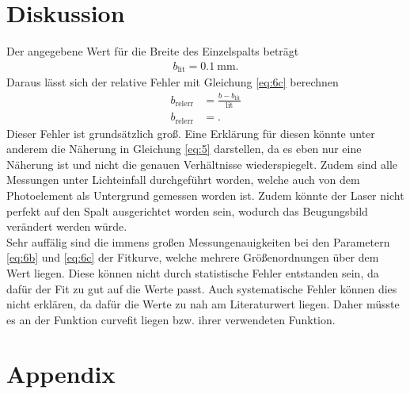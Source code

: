\section{Diskussion}
Der angegebene Wert für die Breite des Einzelspalts beträgt
\begin{align}
    b_{\text{lit}} = \SI{0.1}{\milli\meter}. \label{eq:10}
\end{align}
Daraus lässt sich der relative Fehler mit Gleichung \eqref{eq:6c} berechnen
\begin{align}
    b_{\text{relerr}} &= \frac{b-b_{\text{lit}}}{\text{lit}} \label{eq:11}\\
    b_{\text{relerr}} &= \text{}.
\end{align}
Dieser Fehler ist grundsätzlich groß. Eine Erklärung für diesen könnte unter anderem
die Näherung in Gleichung \eqref{eq:5} darstellen, da es eben nur eine Näherung
ist und nicht die genauen Verhältnisse wiederspiegelt. Zudem sind alle Messungen
unter Lichteinfall durchgeführt worden, welche auch von dem Photoelement als Untergrund
gemessen worden ist. Zudem könnte der Laser nicht perfekt auf den Spalt ausgerichtet worden
sein, wodurch das Beugungsbild verändert werden würde.\\ Sehr auffälig sind die immens 
großen Messungenauigkeiten bei den Parametern \eqref{eq:6b} und \eqref{eq:6c} der Fitkurve,
welche mehrere Größenordnungen über dem Wert liegen. Diese können nicht durch statistische
Fehler entstanden sein, da dafür der Fit zu gut auf die Werte passt. Auch systematische Fehler
können dies nicht erklären, da dafür die Werte zu nah am Literaturwert liegen. Daher
müsste es an der Funktion curvefit liegen bzw. ihrer verwendeten Funktion.

\newpage
\printbibliography

\newpage
\section*{Appendix}






